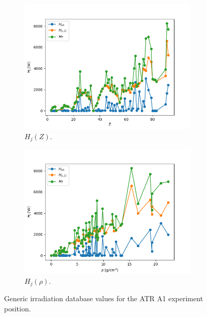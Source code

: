 \begin{figure}[htbp!] %
  \centering
  \begin{subfigure}[b]{0.49\textwidth}
    \centering
    \includegraphics[width=0.95\textwidth]{figures/data-H_Z}
    \caption{$H_j(Z)$.}
  \end{subfigure}
  \hfill
  \begin{subfigure}[b]{0.49\textwidth}
    \centering
    \includegraphics[width=0.95\textwidth]{figures/data-H_rho}
    \caption{$H_j(\rho)$.}
  \end{subfigure}
  \hfill
  \caption{Generic irradiation database values for the ATR A1 experiment position.}
  \label{fig:atr-data}
\end{figure}

